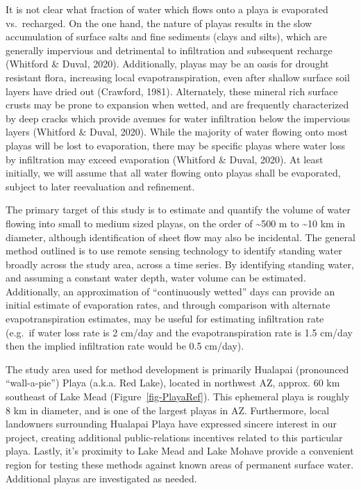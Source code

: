 \documentclass[
]{agujournal2019}
\begin{document}
It is not clear what fraction of water which flows onto a playa is
evaporated vs.~recharged. On the one hand, the nature of playas results
in the slow accumulation of surface salts and fine sediments (clays and
silts), which are generally impervious and detrimental to infiltration
and subsequent recharge (Whitford \& Duval, 2020). Additionally, playas
may be an oasis for drought resistant flora, increasing local
evapotranspiration, even after shallow surface soil layers have dried
out (Crawford, 1981). Alternately, these mineral rich surface crusts may
be prone to expansion when wetted, and are frequently characterized by
deep cracks which provide avenues for water infiltration below the
impervious layers (Whitford \& Duval, 2020). While the majority of water
flowing onto most playas will be lost to evaporation, there may be
specific playas where water loss by infiltration may exceed evaporation
(Whitford \& Duval, 2020). At least initially, we will assume that all
water flowing onto playas shall be evaporated, subject to later
reevaluation and refinement.

The primary target of this study is to estimate and quantify the volume
of water flowing into small to medium sized playas, on the order of
\textasciitilde500 m to \textasciitilde10 km in diameter, although
identification of sheet flow may also be incidental. The general method
outlined is to use remote sensing technology to identify standing water
broadly across the study area, across a time series. By identifying
standing water, and assuming a constant water depth, water volume can be
estimated. Additionally, an approximation of ``continuously wetted''
days can provide an initial estimate of evaporation rates, and through
comparison with alternate evapotranspiration estimates, may be useful
for estimating infiltration rate (e.g.~if water loss rate is 2 cm/day
and the evapotranspiration rate is 1.5 cm/day then the implied
infiltration rate would be 0.5 cm/day).

The study area used for method development is primarily Hualapai
(pronounced ``wall-a-pie'') Playa (a.k.a. Red Lake), located in
northwest AZ, approx. 60 km southeast of Lake Mead
(Figure~\ref{fig-PlayaRef}). This ephemeral playa is roughly 8 km in
diameter, and is one of the largest playas in AZ. Furthermore, local
landowners surrounding Hualapai Playa have expressed sincere interest in
our project, creating additional public-relations incentives related to
this particular playa. Lastly, it's proximity to Lake Mead and Lake
Mohave provide a convenient region for testing these methods against
known areas of permanent surface water. Additional playas are
investigated as needed.
\end{document}
